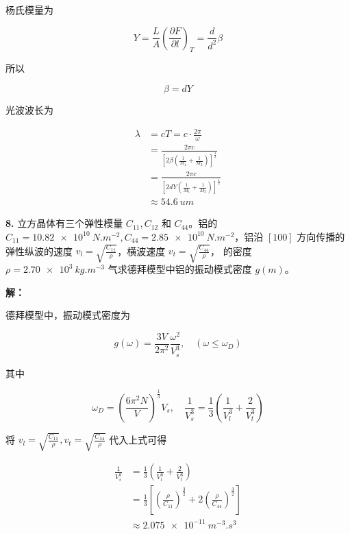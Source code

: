 杨氏模量为

\begin{equation*}
    Y = \frac{L}{A} \left(\frac{\partial F}{\partial l}\right)_T = \frac{d}{d^2} \beta
\end{equation*}

所以

\begin{equation*}
    \beta = dY
\end{equation*}

光波波长为

\begin{align*}
    \lambda &= cT = c \cdot \frac{2\pi}{\omega} \\
    &= \frac{2\pi c}{\left[2\beta \left(\frac{1}{M_1}+\frac{1}{M_2}\right)\right]^{\frac{1}{2}}} \\
    &= \frac{2\pi c}{\left[2dY \left(\frac{1}{M_1}+\frac{1}{M_2}\right)\right]^{\frac{1}{2}}} \\
    &\approx \qty{54.6}{um}
\end{align*}

\noindent \textbf{8.\quad} 立方晶体有三个弹性模量 $C_{11}, C_{12}$ 和 $C_{44}$。铝的 $C_{11}=\qty{10.82e10}{N.m^{-2}}, C_{44}=\qty{2.85e10}{N.m^{-2}}$，铝沿 $[100]$ 方向传播的弹性纵波的速度 $v_l=\sqrt{\frac{C_{11}}{\rho}}$，横波速度 $v_t=\sqrt{\frac{C_{44}}{\rho}}$， 的密度 $\rho=\qty{2.70e3}{kg.m^{-3}}$ 气求德拜模型中铝的振动模式密度 $g(m)$。

\noindent \textbf{解：}

德拜模型中，振动模式密度为

\begin{equation*}
    g(\omega) = \frac{3V}{2\pi^2} \frac{\omega^2}{V_s^3}, \quad (\omega \le \omega_D)
\end{equation*}

其中

\begin{equation*}
    \omega_D = \left(\frac{6\pi^2 N}{V}\right)^{\frac{1}{3}} V_s, \quad \frac{1}{V_s^3} = \frac{1}{3} \left(\frac{1}{V_l^3}+\frac{2}{V_t^3}\right)
\end{equation*}

将 $v_l=\sqrt{\frac{C_{11}}{\rho}}, v_t=\sqrt{\frac{C_{44}}{\rho}}$ 代入上式可得

\begin{align*}
    \frac{1}{V_s^3} &= \frac{1}{3} \left(\frac{1}{V_l^3}+\frac{2}{V_t^3}\right) \\
    &= \frac{1}{3} \left[\left(\frac{\rho}{C_{11}}\right)^{\frac{3}{2}}+2\left(\frac{\rho}{C_{44}}\right)^{\frac{3}{2}}\right] \\
    &\approx \qty{2.075e-11}{m^{-3}.s^3}
\end{align*}

